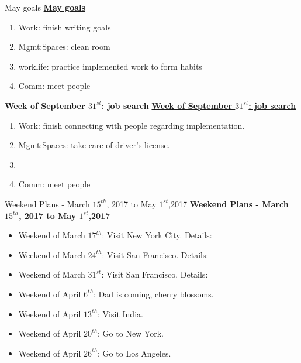 \begin{columns}
\begin{column}{0.333\columnwidth}
\begin{columns}
\begin{column}{0.5\columnwidth}
\ifdefined\POSTER
\begin{block}{May goals}
\else
\underline{\bf May goals}\\
\fi 

\begin{enumerate} 
\item \small Work: finish writing goals
  \small \item \small Mgmt:Spaces: clean room 
\item \small worklife: practice implemented work to form habits 
\item \small Comm: meet people 
\end{enumerate}

\ifdefined\POSTER
\end{block}
\fi

\ifdefined\POSTER
\begin{block}{\small \bf Week of September $31^{st}$: job search}
\else
\underline{\bf Week of September $31^{st}$: job search}\\
\fi

\begin{enumerate}
\tiny \item \tiny Work: finish connecting with people regarding implementation. 
\item \tiny Mgmt:Spaces: take care of driver's license. 
\item \tiny 
\item \tiny Comm: meet people 
\end{enumerate}

\ifdefined\POSTER
\end{block}
\fi

\ifdefined\POSTER
\begin{block}{Weekend Plans - March $15^{th}$, 2017 to May $1^{st}$,2017} 
\else
{\underline{\bf Weekend Plans - March $15^{th}$, 2017 to May $1^{st}$,2017}}\\ 
\fi
\begin{itemize}
\item \tiny Weekend of March $17^{th}$: Visit New York City. Details:
\item \tiny Weekend of March $24^{th}$: Visit San Francisco. Details:
\item \tiny Weekend of March $31^{st}$: Visit San Francisco. Details:
\item \tiny Weekend of April $6^{th}$:  Dad is coming, cherry
  blossoms.
\item \tiny Weekend of April $13^{th}$: Visit India.
\item \tiny Weekend of April $20^{th}$: Go to New York.
\item \tiny Weekend of April $26^{th}$: Go to Los Angeles.
\end{itemize}


\end{block}
\end{column}
\end{columns}
\end{column}
\end{columns}
